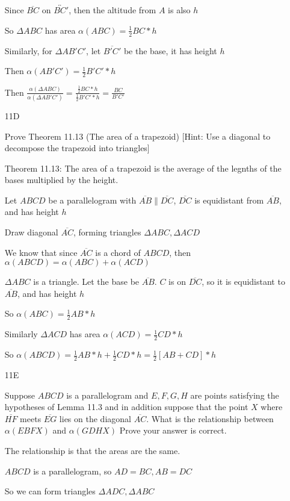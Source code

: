 \documentclass[11pt]{article}
\newcommand{\lines}[1]{\overleftrightarrow{#1}}
\newcommand{\segment}[1]{\overline{#1}}
\begin{document}
\begin{itemize}
		Since $\segment{BC}$ on $\lines{BC'}$, then the altitude from $A$ is also $h$

		So $\Delta ABC$ has area $\alpha(ABC) = \frac{1}{2} BC*h$

		Similarly, for $\Delta AB'C'$, let $\segment{B'C'}$ be the base, it has height $h$

		Then $\alpha(AB'C') = \frac{1}{2} B'C'*h$

		Then $\frac{\alpha(\Delta ABC)}{\alpha(\Delta AB'C')} = \frac{\frac{1}{2}BC*h}{\frac{1}{2}B'C'*h} =	\frac{BC}{B'C'}$
	\item[11D]

		Prove Theorem 11.13 (The area of a trapezoid) [Hint: Use a diagonal to decompose the trapezoid into triangles]

		Theorem 11.13: The area of a trapezoid is the average of the legnths of the bases multiplied by the height.

		Let $ABCD$ be a parallelogram with $\segment{AB} \parallel \segment{DC}$, $\segment{DC}$ is equidistant from $\segment{AB}$, and has height $h$

		Draw diagonal $\segment{AC}$, forming triangles $\Delta ABC, \Delta ACD$

		We know that since $\segment{AC}$ is a chord of $ABCD$, then $\alpha(ABCD) = \alpha(ABC) + \alpha(ACD)$

		$\Delta ABC$ is a triangle. Let the base be $\segment{AB}$. $C$ is on $\segment{DC}$, so it is equidistant to $\segment{AB}$, and has height $h$

		So $\alpha(ABC) = \frac{1}{2}AB*h$

		Similarly $\Delta ACD$ has area $\alpha(ACD) = \frac{1}{2}CD*h$

		So $\alpha(ABCD) = \frac{1}{2}AB*h + \frac{1}{2}CD*h = \frac{1}{2}[AB + CD]*h$

	\item[11E]

		Suppose $ABCD$ is a parallelogram and $E,F,G,H$ are points satisfying the hypotheses of Lemma 11.3 and in addition suppose that the point $X$ where $\segment{HF}$ meets $\segment{EG}$ lies on the diagonal $\segment{AC}$. What is the relationship between $\alpha(EBFX)$ and $\alpha(GDHX)$ Prove your answer is correct.

		The relationship is that the areas are the same.

		$ABCD$ is a parallelogram, so $AD = BC, AB = DC$

		So we can form triangles $\Delta ADC, \Delta ABC$


\end{itemize}
\end{document}
